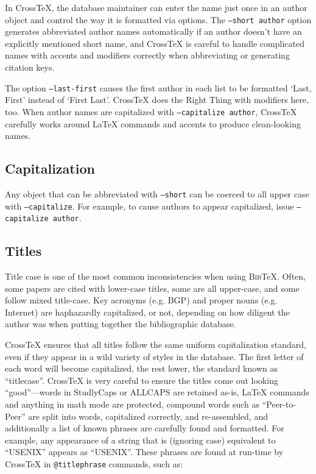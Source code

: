 \documentclass{article}
\newcommand{\XTX}{Cross\TeX}
\newcommand{\BibTeX}{\textsc{Bib}\TeX}
\begin{document}
In \XTX{}, the database maintainer can enter the name just once in an
author object and control the way it is formatted via options. The
\texttt{--short author} option generates abbreviated author names
automatically if an author doesn't have an explicitly mentioned short
name, and \XTX{} is careful to handle complicated names with accents
and modifiers correctly when abbreviating or generating citation keys.

The option \texttt{--last-first} causes the first author in each list
to be formatted `Last, First' instead of `First Last'.  \XTX{} does the
Right Thing with modifiers here, too.  When author names are capitalized
with \texttt{--capitalize author}, \XTX{} carefully works around \LaTeX{}
commands and accents to produce clean-looking names.

\subsection{Capitalization}

Any object that can be abbreviated with \texttt{--short} can be coerced to
all upper case with \texttt{--capitalize}.  For example, to cause authors
to appear capitalized, issue \texttt{--capitalize author}.

\subsection{Titles}

Title case is one of the most common inconsistencies when using
\BibTeX{}. Often, some papers are cited with lower-case titles, some are all
upper-case, and some follow mixed title-case. Key acronyms (e.g. BGP)
and proper nouns (e.g. Internet) are haphazardly capitalized, or not,
depending on how diligent the author was when putting together the
bibliographic database.

\XTX{} ensures that all titles follow the same uniform capitalization
standard, even if they appear in a wild variety of styles in the database.
The first letter of each word will become capitalized, the rest lower,
the standard known as ``titlecase''.  \XTX{} is very careful to ensure
the titles come out looking ``good''---words in StudlyCaps or ALLCAPS are
retained as-is, \LaTeX{} commands and anything in math mode are protected,
compound words such as ``Peer-to-Peer'' are split into words, capitalized
correctly, and re-assembled, and additionally a list of known phrases are
carefully found and formatted.  For example, any appearance of a string
that is (ignoring case) equivalent to ``USENIX'' appears as ``USENIX''.
These phrases are found at run-time by \XTX{} in \texttt{@titlephrase}
commands, such as:
\end{document}
